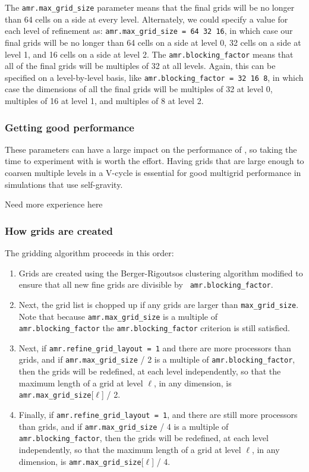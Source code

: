 The {\tt amr.max\_grid\_size} parameter means that the final grids
will be no longer than 64 cells on a side at every level.
Alternately, we could specify a value for each level of refinement as:
{\tt amr.max\_grid\_size = 64 32 16}, in which case our final grids
will be no longer than 64 cells on a side at level 0, 32 cells on a
side at level 1, and 16 cells on a side at level 2.  The {\tt amr.blocking\_factor}
means that all of the final grids will be multiples of 32 at all levels.
Again, this can be specified on a level-by-level basis, like
{\tt amr.blocking\_factor = 32 16 8}, in which case the 
dimensions of all the final grids will be multiples of 32
at level 0, multiples of 16 at level 1, and multiples of 8 at level 2.

\subsubsection{Getting good performance}

These parameters can have a large impact on the performance
of \castro, so taking the time to experiment with is worth the effort.
Having grids that are large enough to coarsen multiple levels in a
V-cycle is essential for good multigrid performance in simulations
that use self-gravity.

{\color{red} Need more experience here}

\subsubsection{How grids are created}

The gridding algorithm proceeds in this order:
\begin{enumerate}
\item Grids are created using the Berger-Rigoutsos clustering algorithm 
modified to ensure that all new fine grids are divisible by {\tt
amr.blocking\_factor}.

\item Next, the grid list is chopped up if any grids are larger than {\tt max\_grid\_size}.
Note that because {\tt amr.max\_grid\_size} is a multiple of {\tt
amr.blocking\_factor} the {\tt amr.blocking\_factor} criterion is
still satisfied.

\item Next, if {\tt amr.refine\_grid\_layout = 1} and there are more processors than grids, and
if {\tt amr.max\_grid\_size} / 2 is a multiple of {\tt amr.blocking\_factor},
then the grids will be redefined, at each level independently, so that
the maximum length of a grid at level $\ell$, in any dimension, is
{\tt amr.max\_grid\_size}[$\ell$] / 2.

\item Finally, if {\tt amr.refine\_grid\_layout = 1},  and there are still more processors
than grids, and if {\tt amr.max\_grid\_size} / 4 is a multiple of {\tt
amr.blocking\_factor}, then the grids will be redefined, at each level
independently, so that the maximum length of a grid at level $\ell$,
in any dimension, is {\tt amr.max\_grid\_size}[$\ell$] / 4.
\end{enumerate}


